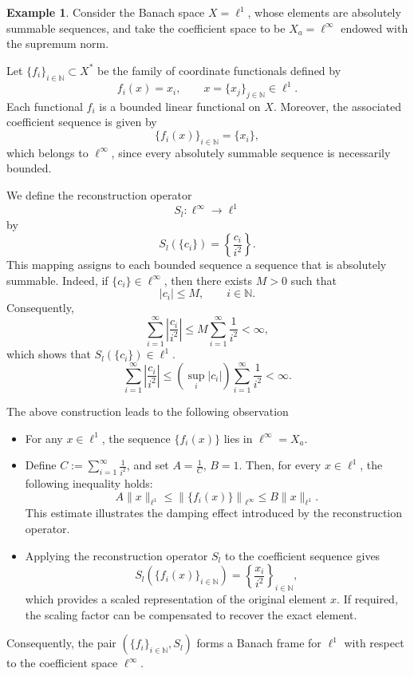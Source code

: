 \documentclass[12pt]{article}
\theoremstyle{definition}
\newtheorem{example}[theorem]{Example}
\theoremstyle{remark}
\begin{document}
\begin{example}
Consider the Banach space \(X=\ell^1\), whose elements are absolutely summable sequences, and take the coefficient space to be \(X_a=\ell^\infty\) endowed with the supremum norm.

Let \(\{f_i\}_{i\in\mathbb{N}}\subset X^*\) be the family of coordinate functionals defined by
\[
f_i(x)=x_i, \qquad x=\{x_j\}_{j\in\mathbb{N}}\in \ell^1.
\]
Each functional \(f_i\) is a bounded linear functional on \(X\). Moreover, the associated coefficient sequence is given by
\[
\{f_i(x)\}_{i\in\mathbb{N}}=\{x_i\},
\]
which belongs to \(\ell^\infty\), since every absolutely summable sequence is necessarily bounded.

We define the reconstruction operator 
\[
S_l:\ell^\infty \rightarrow \ell^1
\]
by
\[
S_l(\{c_i\})=\left\{\frac{c_i}{i^2}\right\}.
\]
This mapping assigns to each bounded sequence a sequence that is absolutely summable. Indeed, if \(\{c_i\}\in\ell^\infty\), then there exists \(M>0\) such that
\[
|c_i|\leq M, \qquad i\in\mathbb{N}.
\]
Consequently,
\[
\sum_{i=1}^{\infty}\left|\frac{c_i}{i^2}\right|
\leq
M\sum_{i=1}^{\infty}\frac{1}{i^2}<\infty,
\]
which shows that \(S_l(\{c_i\})\in\ell^1\).
\[
\sum_{i=1}^\infty \left| \frac{c_i}{i^2} \right| \leq \left( \sup_i |c_i| \right) \sum_{i=1}^\infty \frac{1}{i^2} < \infty.
\]

The above construction leads to the following observation
\begin{itemize}
  \item For any \( x \in \ell^1 \), the sequence \( \{f_i(x)\} \) lies in \( \ell^\infty = X_a \).

  \item Define \( C := \sum_{i=1}^\infty \frac{1}{i^2} \), and set \( A = \frac{1}{C} \), \( B = 1 \). Then, for every \( x \in \ell^1 \), the following inequality holds:
\[
A \| x \|_{\ell^1} \leq \left\| \{f_i(x)\} \right\|_{\ell^\infty} \leq B \| x \|_{\ell^1}.
\]
 This estimate illustrates the damping effect introduced by the reconstruction operator.
 
 \item Applying the reconstruction operator \(S_l\) to the coefficient sequence gives
 \[
 S_l(\{f_i(x)\}_{i\in\mathbb{N}})
 =
 \left\{\frac{x_i}{i^2}\right\}_{i\in\mathbb{N}},
 \]
 which provides a scaled representation of the original element \(x\). If required, the scaling factor can be compensated to recover the exact element.
\end{itemize}
Consequently, the pair \( (\{f_i\}_{i\in\mathbb{N}}, S_l) \) forms a Banach frame for \( \ell^1 \) with respect to the coefficient space \( \ell^\infty. \)
\end{example}
\end{document}
